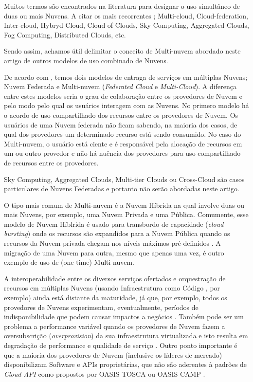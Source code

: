 \documentclass[12pt]{article}
\begin{document}
	Muitos termos são encontrados na literatura para designar o uso simultâneo de duas ou mais Nuvens. A citar os mais recorrentes \cite{Ferrer:2012}; Multi-cloud, Cloud-federation, Inter-cloud, Hybryd Cloud, Cloud of Clouds, Sky Computing, Aggregated Clouds, Fog Computing, Distributed Clouds, etc.
	
	Sendo assim, achamos útil delimitar o conceito de Multi-nuvem abordado neste artigo de outros modelos de uso combinado de Nuvens.
	
	De acordo com \cite{Ferrer:2012}, temos dois modelos de entraga de serviços em múltiplas Nuvens; Nuvem Federada e Multi-nuvem (\textit{Federated Cloud} e \textit{Multi-Cloud}). A diferença entre estes modelos seria o grau de colaboração entre os provedores de Nuvem e pelo modo pelo qual os usuários interagem com as Nuvens. No primero modelo há o acordo de uso compartilhado dos recursos entre os provedores de Nuvem. Os usuários de uma Nuvem federada não ficam sabendo, na maioria dos casos, de qual dos provedores um determinado recurso está sendo consumido. No caso do Multi-nuvem, o usuário está ciente e é responsável pela alocação de recursos em um ou outro provedor e não há nuência dos provedores para uso compartilhado de recursos entre os provedores.
	
	Sky Computing, Aggregated Clouds, Multi-tier Clouds ou Cross-Cloud são casos particulares de Nuvens Federadas e portanto não serão abordadas neste artigo. 
	
	O tipo mais comum de Multi-nuvem é a Nuvem Híbrida na qual involve duas ou mais Nuvens, por exemplo, uma Nuvem Privada e uma Pública. Comumente, esse modelo de Nuvem Híblrida é usado para transbordo de capacidade (\textit{cloud bursting}) onde os recursos são expandidos para a Nuvem Pública quando os recursos da Nuvem privada chegam nos níveis máximos pré-definidos \cite{Ferrer:2012}. A migração de uma Nuvem para outra, mesmo que apenas uma vez, é outro exemplo de uso de (one-time) Multi-nuvem.
	
	A interoperabilidade entre os diversos serviços ofertados e orquestração de recursos em múltiplas Nuvens (usando Infraestrutura como Código \cite{Morris:2016}, por exemplo) ainda está distante da maturidade, já que, por exemplo, todos os provedores de Nuvens experimentam, eventualmente, períodos de indisponibilidade que podem causar impactos a negócios \cite{Fisher:2018}. Também pode ser um problema a performance variável quando os provedores de Nuvem fazem a oversubscrição (\textit{overprovision}) da sua infraestrutura virtualizada e isto resulta em degradação de performance e qualidade de serviço \cite{CloudSpectator:2017}. Outro ponto importante é que a maioria dos provedores de Nuvem  (inclusive os líderes de mercado) disponibilizam Software e APIs proprietárias, que não são aderentes à padrões de \textit{Cloud API} como propostos por OASIS TOSCA \cite{TOSCA:2019} ou OASIS CAMP \cite{CAMP:2019}.
	 
\end{document}
